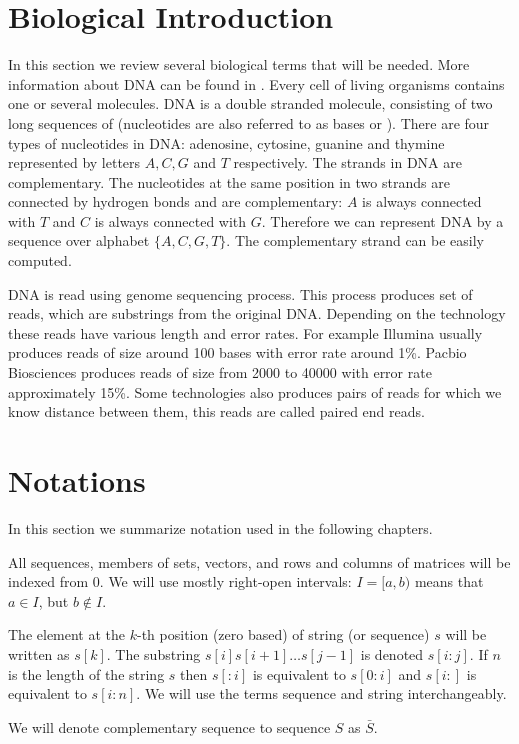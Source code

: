 \section{Biological Introduction}



In this section we review several biological terms that will be needed. More
information about DNA can be found in
\cite{BiologyForDummies,UnderstandingBioinformatics}.  Every cell of living
organisms contains one or several  molecules. DNA is a double
stranded molecule, consisting of two long sequences of 
(nucleotides are also referred to as bases or ). There are
four types of nucleotides in DNA: adenosine, cytosine, guanine and thymine
represented by letters $A,C,G$ and $T$ respectively. 
The strands in DNA are complementary. The
nucleotides at the same position in two strands are connected by hydrogen bonds
and are complementary: $A$ is always connected with $T$ and $C$ is always
connected with $G$. Therefore we can represent DNA by a sequence over alphabet
$\{A,C,G,T\}$. The complementary strand can be easily computed.

DNA is read using genome sequencing process. This process produces
set of reads, which are substrings from the original DNA. 
Depending on the technology these reads have various length and error rates.
For example Illumina usually produces reads of size around 100 bases with
error rate around 1\%. Pacbio Biosciences produces
reads of size from 2000 to 40000 with error rate approximately 15\%.
Some technologies also produces pairs of reads for which we know
distance between them, this reads are called paired end reads.

\section{Notations}

In this section we summarize notation used in the following
chapters.

All sequences, members of sets, vectors, and rows and columns of matrices will
be indexed from $0$. We will use mostly right-open intervals: $I=[a,b)$ means
that $a\in I$, but $b\notin I$. 

The element at the $k$-th position (zero based) of string (or sequence) $s$ will
be written as $s[k]$. The substring $s[i]s[i+1]\dots s[j-1]$ is denoted
$s[i:j]$.  If $n$ is the length of the string $s$ then $s[:i]$ is equivalent to
$s[0:i]$ and $s[i:]$ is equivalent to $s[i:n]$.  We will use the terms sequence
and string interchangeably.

We will denote complementary sequence to sequence $S$ as $\bar{S}$.
